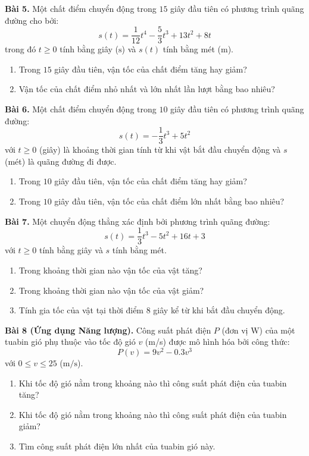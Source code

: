 \documentclass[12pt]{article}
\begin{document}
	\begin{btvang}
		\textbf{Bài 5.} Một chất điểm chuyển động trong $15$ giây đầu tiên có phương trình quãng đường cho bởi:
		$$s(t) = \dfrac{1}{12}t^4 - \dfrac{5}{3}t^3 + 13t^2 + 8t$$
		trong đó $t \ge 0$ tính bằng giây ($\text{s}$) và $s(t)$ tính bằng mét ($\text{m}$).
		\begin{enumerate}[label=\alph*)]
			\item Trong $15$ giây đầu tiên, vận tốc của chất điểm tăng hay giảm?
			\item Vận tốc của chất điểm nhỏ nhất và lớn nhất lần lượt bằng bao nhiêu?
		\end{enumerate}
		
		\textbf{Bài 6.} Một chất điểm chuyển động trong $10$ giây đầu tiên có phương trình quãng đường:
		$$s(t) = -\dfrac{1}{3}t^3 + 5t^2$$
		với $t \ge 0$ (giây) là khoảng thời gian tính từ khi vật bắt đầu chuyển động và $s$ (mét) là quãng đường đi được.
		\begin{enumerate}[label=\alph*)]
			\item Trong $10$ giây đầu tiên, vận tốc của chất điểm tăng hay giảm?
			\item Trong $10$ giây đầu tiên, vận tốc của chất điểm lớn nhất bằng bao nhiêu?
		\end{enumerate}
		
		\textbf{Bài 7.} Một chuyển động thẳng xác định bởi phương trình quãng đường:
		$$s(t) = \dfrac{1}{3}t^3 - 5t^2 + 16t + 3$$
		với $t \ge 0$ tính bằng giây và $s$ tính bằng mét.
		\begin{enumerate}[label=\alph*)]
			\item Trong khoảng thời gian nào vận tốc của vật tăng?
			\item Trong khoảng thời gian nào vận tốc của vật giảm?
			\item Tính gia tốc của vật tại thời điểm $8$ giây kể từ khi bắt đầu chuyển động.
		\end{enumerate}
		
		\textbf{Bài 8 (Ứng dụng Năng lượng).} Công suất phát điện $P$ (đơn vị $\text{W}$) của một tuabin gió phụ thuộc vào tốc độ gió $v$ (m/s) được mô hình hóa bởi công thức:
		$$P(v) = 9v^2 - 0.3v^3$$
		với $0 \le v \le 25$ ($\text{m/s}$).
		\begin{enumerate}[label=\alph*)]
			\item Khi tốc độ gió nằm trong khoảng nào thì công suất phát điện của tuabin tăng?
			\item Khi tốc độ gió nằm trong khoảng nào thì công suất phát điện của tuabin giảm?
			\item Tìm công suất phát điện lớn nhất của tuabin gió này.
		\end{enumerate}
	\end{btvang}
	
\end{document}
